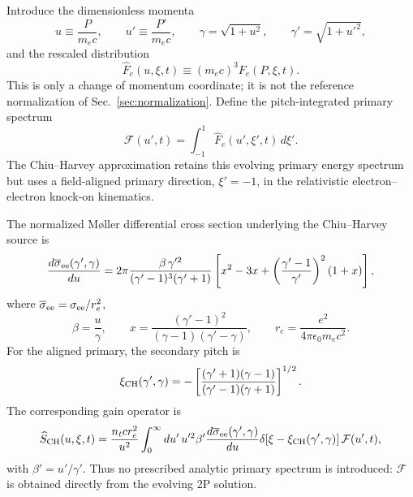 \documentclass[11pt]{article}
\begin{document}
Introduce the dimensionless momenta
\begin{equation}
 u\equiv\frac{P}{m_ec},\qquad
 u'\equiv\frac{P'}{m_ec},\qquad
 \gamma=\sqrt{1+u^2},\qquad
 \gamma'=\sqrt{1+u'^2},
 \label{eq:ch_auxiliary_momenta}
\end{equation}
and the rescaled distribution
\begin{equation}
 \widehat F_e(u,\xi,t)\equiv(m_ec)^3F_e(P,\xi,t).
 \label{eq:ch_hat_definition}
\end{equation}
This is only a change of momentum coordinate; it is not the reference normalization of
Sec.~\ref{sec:normalization}.  Define the pitch-integrated primary spectrum
\begin{equation}
 \boxed{
 \mathcal F(u',t)=\int_{-1}^{1}\widehat F_e(u',\xi',t)\,d\xi'.
 }
 \label{eq:ch_primary_spectrum}
\end{equation}
The Chiu--Harvey approximation retains this evolving primary energy spectrum but uses a
field-aligned primary direction, $\xi'=-1$, in the relativistic electron--electron
knock-on kinematics.

The normalized M{\o}ller differential cross section underlying the Chiu--Harvey source is
\cite{Moller1932,Chiu1998,Harvey2000,Arnaud2025}
\begin{equation}
 \frac{d\overline\sigma_{\rm ee}(\gamma',\gamma)}{du}
 =2\pi
 \frac{\beta\,\gamma'^2}{(\gamma'-1)^3(\gamma'+1)}
 \left[
  x^2-3x+\left(\frac{\gamma'-1}{\gamma'}\right)^2(1+x)
 \right],
 \label{eq:ch_knockon_cross_section}
\end{equation}
where $\overline\sigma_{\rm ee}=\sigma_{\rm ee}/r_e^2$,
\begin{equation}
 \beta=\frac{u}{\gamma},\qquad
 x=\frac{(\gamma'-1)^2}{(\gamma-1)(\gamma'-\gamma)},\qquad
 r_e=\frac{e^2}{4\pi\epsilon_0m_ec^2}.
 \label{eq:ch_knockon_cross_section_aux}
\end{equation}
For the aligned primary, the secondary pitch is
\begin{equation}
 \xi_{\rm CH}(\gamma',\gamma)
 =-\left[
  \frac{(\gamma'+1)(\gamma-1)}{(\gamma'-1)(\gamma+1)}
 \right]^{1/2}.
 \label{eq:ch_secondary_pitch}
\end{equation}
The corresponding gain operator is
\begin{equation}
 \widehat S_{\rm CH}(u,\xi,t)
 =\frac{n_t c r_e^2}{u^2}
  \int_0^\infty du'\,u'^2\beta'
  \frac{d\overline\sigma_{\rm ee}(\gamma',\gamma)}{du}
  \delta\!\left[\xi-\xi_{\rm CH}(\gamma',\gamma)\right]
  \mathcal F(u',t),
 \label{eq:ch_integral_source}
\end{equation}
with $\beta'=u'/\gamma'$.  Thus no prescribed analytic primary spectrum is introduced:
$\mathcal F$ is obtained directly from the evolving 2P solution.
\end{document}
